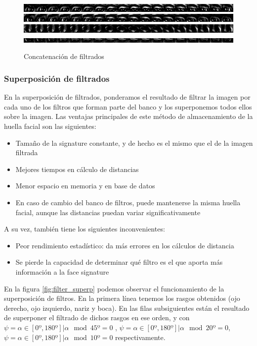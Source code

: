 \begin{figure}[h!]
	\includegraphics[width=15cm]{imagenes/M2_concat_od_10deg.png}
	\includegraphics[width=15cm]{imagenes/M2_concat_oi_10deg.png}
	\includegraphics[width=15cm]{imagenes/M2_concat_nariz_10deg.png}
	\includegraphics[width=15cm]{imagenes/M2_concat_boca_10deg.png}
	\caption{Concatenación de filtrados}
	\label{fig:filter_concat}
\end{figure}

\subsubsection{Superposición de filtrados}
En la superposición de filtrados, ponderamos el resultado de filtrar la imagen por cada uno de los filtros que forman parte del banco y los superponemos todos ellos sobre la imagen. Las ventajas principales de este método de almacenamiento de la huella facial son las siguientes:
\begin{itemize}
	\item{Tamaño de la signature constante, y de hecho es el mismo que el de la imagen filtrada}
	\item{Mejores tiempos en cálculo de distancias}
	\item{Menor espacio en memoria y en base de datos}
	\item{En caso de cambio del banco de filtros, puede mantenerse la misma huella facial, aunque las distancias puedan variar significativamente}
\end{itemize}
A su vez, también tiene los siguientes inconvenientes:
\begin{itemize}
	\item{Peor rendimiento estadístico: da más errores en los cálculos de distancia}
	\item{Se pierde la capacidad de determinar qué filtro es el que aporta más información a la face signature}
\end{itemize}

En la figura \ref{fig:filter_superp} podemos observar el funcionamiento de la superposición de filtros. En la primera línea tenemos los rasgos obtenidos (ojo derecho, ojo izquierdo, nariz y boca). En las filas subsiguientes están el resultado de superponer el filtrado de dichos rasgos en ese orden, y con $\psi = \alpha \in \left[0º,180º\right] | \alpha \mod{45º}=0$ ,  $\psi = \alpha \in \left[0º,180º\right] | \alpha \mod{20º}=0$,  $\psi = \alpha \in \left[0º,180º\right] | \alpha \mod{10º}=0$ respectivamente.


